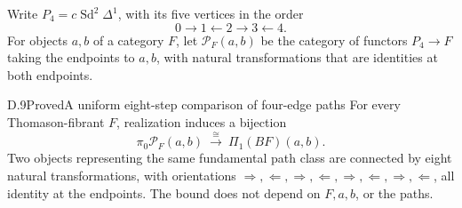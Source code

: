 Write $P_4=c\operatorname{Sd}^2\Delta^1$, with its five vertices in the order
\[
 0\longrightarrow1\longleftarrow2\longrightarrow3\longleftarrow4.
\]
For objects $a,b$ of a category $F$, let $\mathscr P_F(a,b)$ be the category of functors $P_4\to F$ taking the endpoints to $a,b$, with natural transformations that are identities at both endpoints.

\begin{claim}{D.9}{Proved}{A uniform eight-step comparison of four-edge paths}
For every Thomason-fibrant $F$, realization induces a bijection
\[
 \pi_0\mathscr P_F(a,b)\ \xrightarrow{\ \cong\ }\ \Pi_1(BF)(a,b).
\]
Two objects representing the same fundamental path class are connected by eight natural transformations, with orientations
$\Rightarrow,\Leftarrow,\Rightarrow,\Leftarrow,\Rightarrow,\Leftarrow,\Rightarrow,\Leftarrow$,
all identity at the endpoints. The bound does not depend on $F,a,b$, or the paths.
\end{claim}
